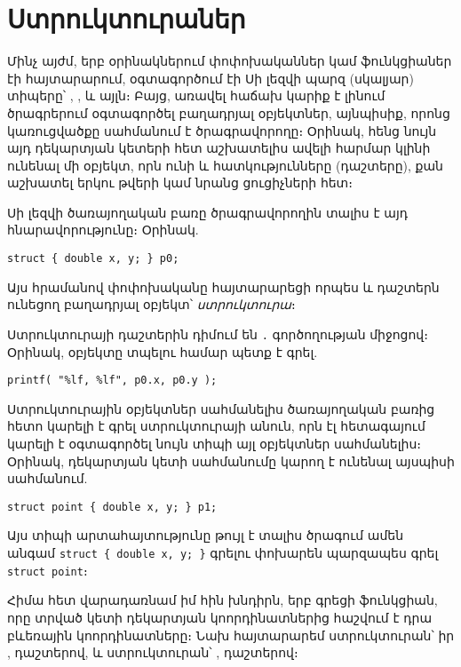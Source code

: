 \chapter{Ստրուկտուրաներ}


Մինչ այժմ, երբ օրինակներում փոփոխականներ կամ ֆունկցիաներ էի հայտարարում,
օգտագործում էի Սի լեզվի պարզ (սկալյար) տիպերը՝ , ,
 և այլն։ Բայց, առավել հաճախ կարիք է լինում ծրագրերում օգտագործել
բաղադրյալ օբյեկտներ, այնպիսիք, որոնց կառուցվածքը սահմանում է ծրագրավորողը։
Օրինակ, հենց նույն այդ դեկարտյան կետերի հետ աշխատելիս ավելի հարմար կլինի
ունենալ մի օբյեկտ, որն ունի  և  հատկությունները
(դաշտերը), քան աշխատել երկու  թվերի կամ նրանց ցուցիչների հետ։

Սի լեզվի  ծառայողական բառը ծրագրավորողին տալիս է այդ
հնարավորությունը։ Օրինակ.

\begin{Verbatim}
struct { double x, y; } p0;
\end{Verbatim}

Այս հրամանով  փոփոխականը հայտարարեցի որպես  և 
դաշտերն ունեցող բաղադրյալ օբյեկտ՝ \emph{ստրուկտուրա}։

Ստրուկտուրայի դաշտերին դիմում են \Verb|.| գործողության միջոցով։ Օրինակ,
 օբյեկտը տպելու համար պետք է գրել.

\begin{Verbatim}
printf( "%lf, %lf", p0.x, p0.y );
\end{Verbatim}

Ստրուկտուրային օբյեկտներ սահմանելիս  ծառայողական բառից հետո
կարելի է գրել ստրուկտուրայի անուն, որն էլ հետագայում կարելի է օգտագործել
նույն տիպի այլ օբյեկտներ սահմանելիս։ Օրինակ,  դեկարտյան կետի
սահմանումը կարող է ունենալ այսպիսի սահմանում.

\begin{Verbatim}
struct point { double x, y; } p1;
\end{Verbatim}

Այս տիպի արտահայտությունը թույլ է տալիս ծրագում ամեն անգամ
\texttt{struct \{ double x, y; \}} գրելու փոխարեն պարզապես գրել
\texttt{struct point}։

Հիմա հետ վարադառնամ իմ հին խնդիրն, երբ գրեցի  ֆունկցիան, որը
տրված կետի դեկարտյան կոորդինատներից հաշվում է դրա բևեռային կոորդինատները։
Նախ հայտարարեմ  ստրուկտուրան՝ իր ,
 դաշտերով, և  ստրուկտուրան՝ ,
 դաշտերով։

